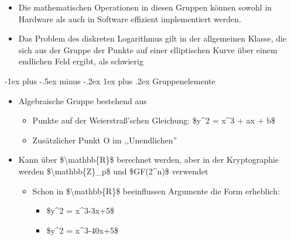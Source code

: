 \documentclass[a4paper]{article}
\makeatletter
\renewcommand{\subsubsection}{\@startsection{subsubsection}{3}{0mm}%
 {-1ex plus -.5ex minus -.2ex}%
 {1ex plus .2ex}%
 {\normalfont\small\bfseries}}
\makeatother
\begin{document}
\begin{multicols}{3}
\begin{itemize}
              \begin{itemize}
                  \item
                        Die mathematischen Operationen in diesen Gruppen können sowohl in
                        Hardware als auch in Software effizient implementiert werden.
                  \item
                        Das Problem des diskreten Logarithmus gilt in der allgemeinen
                        Klasse, die sich aus der Gruppe der Punkte auf einer elliptischen
                        Kurve über einem endlichen Feld ergibt, als schwierig
              \end{itemize}
    \end{itemize}


    \subsubsection{Gruppenelemente}

    \begin{itemize}
        \item
              Algebraische Gruppe bestehend aus

              \begin{itemize}
                  \item
                        Punkte auf der Weierstraß'schen Gleichung: \$y\^{}2 = x\^{}3 + ax +
                        b\$
                  \item
                        Zusätzlicher Punkt O im ,,Unendlichen''
              \end{itemize}
        \item
              Kann über \$\textbackslash mathbb\{R\}\$ berechnet werden, aber in der
              Kryptographie werden \$\textbackslash mathbb\{Z\}\_p\$ und
              \$GF(2\^{}n)\$ verwendet

              \begin{itemize}
                  \item
                        Schon in \$\textbackslash mathbb\{R\}\$ beeinflussen Argumente die
                        Form erheblich:

                        \begin{itemize}
                            \item
                                  \$y\^{}2 = x\^{}3-3x+5\$
                            \item
                                  \$y\^{}2 = x\^{}3-40x+5\$
                        \end{itemize}
              \end{itemize}
    \end{itemize}



\end{multicols}
\end{document}
